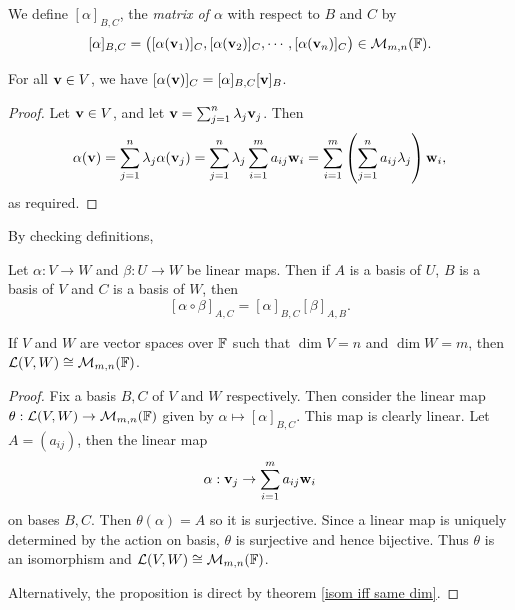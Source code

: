 \documentclass[a4paper,11pt]{article}
\begin{document}
\begin{definition}
    We define $[\alpha]_{B, C}$, the \emph{matrix of $\alpha$} with respect to $B$ and $C$ by
    $$
    [\alpha]_{B, C} = \begin{pmatrix}
        [\alpha({\bf v}_1)]_C, [\alpha({\bf v}_2)]_C, \cdots, [\alpha({\bf v}_n)]_C
    \end{pmatrix} \in \mathcal{M}_{m, n}({\mathbb{F}}).
    $$ 
\end{definition}
\begin{lemma}
    For all $\mathbf{v} \in V$, we have $[\alpha(\mathbf{v})]_C = [\alpha]_{B,C}  [\mathbf{v}]_B$.
\end{lemma}
\begin{proof}
    Let $\mathbf{v} \in V$, and let $\mathbf{v} = \sum_{j = 1}^n \lambda_j \mathbf{v}_j$. Then
    $$
    \alpha(\mathbf{v}) = \sum_{j = 1}^n \lambda_j \alpha(\mathbf{v}_j) = \sum_{j = 1}^n \lambda_j \sum_{i = 1}^m a_{ij} \mathbf{w}_i = \sum_{i = 1}^m \left(\sum_{j = 1}^n a_{ij} \lambda_j\right) \mathbf{w}_i,
    $$
    as required.
\end{proof}
By checking definitions,
\begin{lemma}
    Let $\alpha: V \rightarrow W$ and $\beta: U \rightarrow W$ be linear maps. Then if $A$ is a basis of $U$, $B$ is a basis of $V$ and $C$ is a basis of $W$, then
    $$
    [\alpha \circ \beta]_{A, C} = [\alpha]_{B, C}  [\beta]_{A, B}.
    $$
\end{lemma}
\begin{proposition}
    If $V$ and $W$ are vector spaces over ${\mathbb{F}}$ such that $\dim V = n$ and $\dim W = m$, then $\mathcal{L}(V, W) \cong \mathcal{M}_{m, n}({\mathbb{F}})$.
\end{proposition}
\begin{proof}
    Fix a basis $B, C$ of $V$ and $W$ respectively.
    Then consider the linear map
    $
    \theta: \mathcal{L}(V, W) \rightarrow \mathcal{M}_{m, n}({\mathbb{F}})
    $ given by $\alpha \mapsto [\alpha]_{B, C}$.
    This map is clearly linear. Let $ A=(a_{ij}) $, then the linear map 
    \[
        \alpha: {\bf v}_j\to \sum_{i=1}^{m}a_{ij}\mathbf{w}_i
    \]
    on bases $B,C$. Then $ \theta(\alpha)=A $ so it is surjective. Since a linear map is uniquely determined by the action on basis, $ \theta $ is surjective and hence bijective. Thus $\theta$ is an isomorphism and $ {\mathcal{L}}(V,W) \cong {\mathcal{M}}_{m,n}({\mathbb{F}}) $. 

    Alternatively, the proposition is direct by theorem \ref{isom iff same dim}.
\end{proof}
\end{document}
